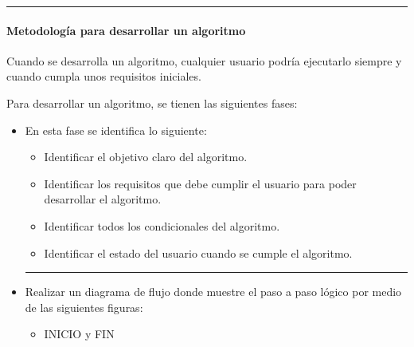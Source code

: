 \documentclass[letterpaper,10pt,spanish]{sphinxmanual}
\begin{document}
\bigskip\hrule\bigskip



\paragraph{Metodología para desarrollar un algoritmo}
\label{\detokenize{cursos/ofimatica11/recursos/T03:metodologia-para-desarrollar-un-algoritmo}}
\sphinxAtStartPar
Cuando se desarrolla un algoritmo, cualquier usuario podría ejecutarlo siempre y cuando cumpla unos requisitos iniciales.

\sphinxAtStartPar
Para desarrollar un algoritmo, se tienen las siguientes fases:
\begin{itemize}
\item {} 
\sphinxAtStartPar
{}

\sphinxAtStartPar
En esta fase se identifica lo siguiente:
\begin{itemize}
\item {} 
\sphinxAtStartPar
{} Identificar el objetivo claro del algoritmo.

\item {} 
\sphinxAtStartPar
{} Identificar los requisitos que debe cumplir el usuario para poder desarrollar el algoritmo.

\item {} 
\sphinxAtStartPar
{} Identificar todos los condicionales del algoritmo.

\item {} 
\sphinxAtStartPar
{} Identificar el estado del usuario cuando se cumple el algoritmo.

\end{itemize}



\bigskip\hrule\bigskip

\item {} 
\sphinxAtStartPar
{}

\sphinxAtStartPar
Realizar un diagrama de flujo donde muestre el paso a paso lógico por medio de las siguientes figuras:
\begin{itemize}
\item {} 
\sphinxAtStartPar
{} INICIO y FIN


\end{itemize}
\end{itemize}
\end{document}
